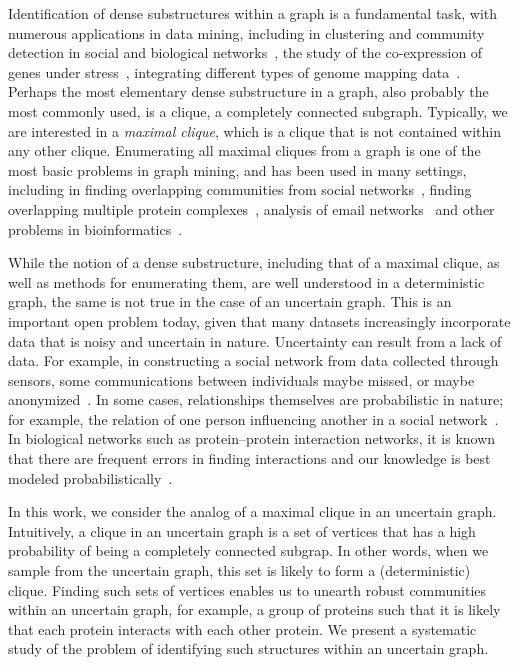 \documentclass[11pt,letterpaper]{article}
\begin{document}
Identification of dense substructures within a graph is a fundamental task, with numerous applications in data mining, including in clustering and community detection in social and biological networks~\cite{PDFV2005}, the study of the co-expression of genes under stress~\cite{Rokhlenko07}, integrating different types of genome mapping data~\cite{Harley01}. Perhaps the most elementary dense substructure in a graph, also probably the most commonly used, is a clique, a completely connected subgraph. Typically, we are interested in a {\em maximal clique}, which is a clique that is not contained within any other clique. Enumerating all maximal cliques from a graph is one of the most basic problems in graph mining, and has been used in many settings, including in finding overlapping communities from social networks~\cite{PDFV2005,ML2014,BKS1980,PYB2012}, finding overlapping multiple protein complexes~\cite{Gavin02}, analysis of email networks~\cite{PMS2006} and other problems in bioinformatics~\cite{HBG2001,GARW1993,ZPKS2008}.

While the notion of a dense substructure, including that of a maximal clique, as well as methods for enumerating them, are well understood in a deterministic graph, the same is not true in the case of an uncertain graph. This is an important open problem today, given that many datasets increasingly incorporate data that is noisy and uncertain in nature. Uncertainty can result from a lack of data. For example, in constructing a social network from data collected through sensors, some communications between individuals maybe missed, or maybe anonymized~\cite{AR2007}. In some cases, relationships themselves are probabilistic in nature; for example, the relation of one person influencing another in a social network~\cite{CWY2009}. In biological networks such as protein--protein interaction networks, it is known that there are frequent errors in finding interactions and our knowledge is best modeled probabilistically~\cite{AKGR2004}.

In this work, we consider the analog of a maximal clique in an uncertain graph. Intuitively, a clique in an uncertain graph is a set of vertices that has a high probability of being a completely connected subgrap. In other words, when we sample from the uncertain graph, this set is likely to form a (deterministic) clique. Finding such sets of vertices enables us to unearth robust communities within an uncertain graph, for example, a group of proteins such that it is likely that each protein interacts with each other protein. We present a systematic study of the problem of identifying such structures within an uncertain graph.
\end{document}
